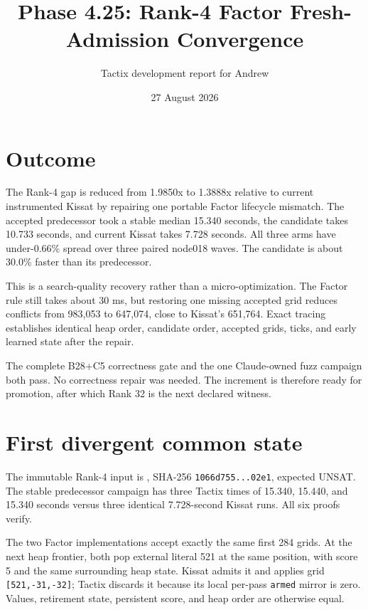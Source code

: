 \documentclass[11pt]{article}
\title{Phase 4.25: Rank-4 Factor Fresh-Admission Convergence}
\author{Tactix development report for Andrew}
\date{27 August 2026}
\newcommand{\code}[1]{\texttt{#1}}
\begin{document}
\maketitle

\section{Outcome}

The Rank-4 gap is reduced from 1.9850x to 1.3888x relative to current
instrumented Kissat by repairing one portable Factor lifecycle mismatch.  The
accepted predecessor took a stable median 15.340 seconds, the candidate takes
10.733 seconds, and current Kissat takes 7.728 seconds.  All three arms have
under-0.66\% spread over three paired node018 waves.  The candidate is about
30.0\% faster than its predecessor.

This is a search-quality recovery rather than a micro-optimization.  The
Factor rule still takes about 30 ms, but restoring one missing accepted grid
reduces conflicts from 983,053 to 647,074, close to Kissat's 651,764.  Exact
tracing establishes identical heap order, candidate order, accepted grids,
ticks, and early learned state after the repair.

The complete B28+C5 correctness gate and the one Claude-owned fuzz campaign
both pass.  No correctness repair was needed.  The increment is therefore
ready for promotion, after which Rank 32 is the next declared witness.

\section{First divergent common state}

The immutable Rank-4 input is
,
SHA-256 \code{1066d755...02e1}, expected UNSAT.  The stable predecessor
campaign has three Tactix times of 15.340, 15.440, and 15.340 seconds versus
three identical 7.728-second Kissat runs.  All six proofs verify.

The two Factor implementations accept exactly the same first 284 grids.  At
the next heap frontier, both pop external literal 521 at the same position,
with score 5 and the same surrounding heap state.  Kissat admits it and applies
grid \code{[521,-31,-32]}; Tactix discards it because its local per-pass
\code{armed} mirror is zero.  Values, retirement state, persistent score, and
heap order are otherwise equal.
\end{document}

